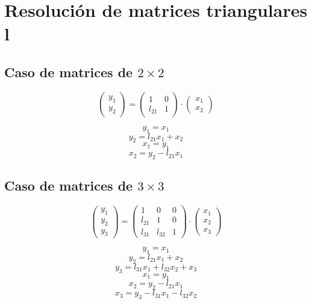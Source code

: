 \documentclass[10pt,a4paper,dvipdfmx]{article}
\begin{document}
\section{Resoluci\'on de matrices triangulares l}
\subsection{Caso de matrices de $2\times 2$ }
$$ \left( 
\begin{array}{c}
y_{1} \\
y_{2} 
 \end{array}
\right)
 = \left( 
\begin{array}{cc}
1 & 0 \\
l_{{2}{1}} & 1 
 \end{array}
\right)
 \cdot \left( 
\begin{array}{c}
x_{1} \\
x_{2} 
 \end{array}
\right)
 $$
\begin{multicols}{2}
$$ y_{1} = x_{1} $$
$$ y_{2} = l_{{2}{1}} x_{1} + x_{2} $$
\vfill\null
\columnbreak
$$ x_{1} = y_{1} $$
$$ x_{2} = y_{2}- l_{{2}{1}} x_{1} $$
\end{multicols}
\subsection{Caso de matrices de $3\times 3$ }
$$ \left( 
\begin{array}{c}
y_{1} \\
y_{2} \\
y_{3} 
 \end{array}
\right)
 = \left( 
\begin{array}{ccc}
1 & 0 & 0 \\
l_{{2}{1}} & 1 & 0 \\
l_{{3}{1}} & l_{{3}{2}} & 1 
 \end{array}
\right)
 \cdot \left( 
\begin{array}{c}
x_{1} \\
x_{2} \\
x_{3} 
 \end{array}
\right)
 $$
\begin{multicols}{2}
$$ y_{1} = x_{1} $$
$$ y_{2} = l_{{2}{1}} x_{1} + x_{2} $$
$$ y_{3} = l_{{3}{1}} x_{1} + l_{{3}{2}} x_{2} + x_{3} $$
\vfill\null
\columnbreak
$$ x_{1} = y_{1} $$
$$ x_{2} = y_{2}- l_{{2}{1}} x_{1} $$
$$ x_{3} = y_{3}- l_{{3}{1}} x_{1}- l_{{3}{2}} x_{2} $$
\end{multicols}
\end{document}
